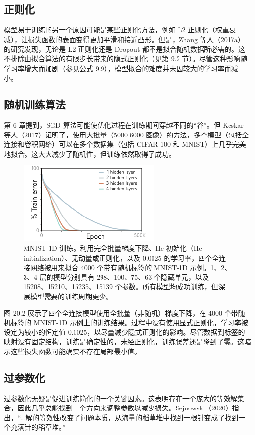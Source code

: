 \subsection{正则化}
模型易于训练的另一个原因可能是某些正则化方法，例如 L2 正则化（权重衰减），让损失函数的表面变得更加平滑和接近凸形。但是，Zhang 等人（2017a）的研究发现，无论是 L2 正则化还是 Dropout 都不是拟合随机数据所必需的。这不排除由拟合算法的有限步长带来的隐式正则化（见第 9.2 节）。尽管这种影响随学习率增大而加剧（参见公式 9.9），模型拟合的难度并未因较大的学习率而减小。

\subsection{随机训练算法}
第 6 章提到，SGD 算法可能使优化过程在训练期间穿越不同的“谷”。但 Keskar 等人（2017）证明了，使用大批量（5000-6000 图像）的方法，多个模型（包括全连接和卷积网络）可以在多个数据集（包括 CIFAR-100 和 MNIST）上几乎完美地拟合。这大大减少了随机性，但训练依然取得了成功。

\begin{figure}[ht!]
\centering
\includegraphics[width=0.7\linewidth]{png/chapter20/WhyGDResults.png}
\caption{MNIST-1D 训练。利用完全批量梯度下降、He 初始化（He initialization）、无动量或正则化，以及 0.0025 的学习率，四个全连接网络被用来拟合 4000 个带有随机标签的 MNIST-1D 示例。1、2、3、4 层的模型分别具有 298、100、75、63 个隐藏单元，以及 15208、15210、15235、15139 个参数。所有模型均成功训练，但深层模型需要的训练周期更少。}
\end{figure}

图 20.2 展示了四个全连接模型使用全批量（非随机）梯度下降，在 4000 个带随机标签的 MNIST-1D 示例上的训练结果。过程中没有使用显式正则化，学习率被设定为较小的恒定值 0.0025，以尽量减少隐式正则化的影响。尽管数据到标签的映射没有固定结构，训练是确定性的，未经正则化，训练误差还是降到了零。这暗示这些损失函数可能确实不存在局部最小值。

\subsection{过参数化}
过参数化无疑是促进训练简化的一个关键因素。这表明存在一个庞大的等效解集合，因此几乎总能找到一个方向来调整参数以减少损失。Sejnowski（2020）指出，“...解的等效性改变了问题本质，从海量的稻草堆中找到一根针变成了找到一个充满针的稻草堆。”


